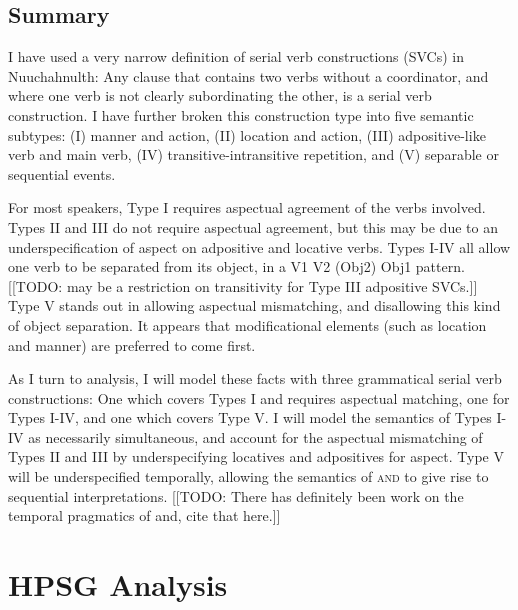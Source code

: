 \subsection{Summary}

I have used a very narrow definition of serial verb constructions (SVCs) in Nuuchahnulth: Any clause that contains two verbs without a coordinator, and where one verb is not clearly subordinating the other, is a serial verb construction. I have further broken this construction type into five semantic subtypes: (I) manner and action, (II) location and action, (III) adpositive-like verb and main verb, (IV) transitive-intransitive repetition, and (V) separable or sequential events.

For most speakers, Type I requires aspectual agreement of the verbs involved. Types II and III do not require aspectual agreement, but this may be due to an underspecification of aspect on adpositive and locative verbs. Types I-IV all allow one verb to be separated from its object, in a V1 V2 (Obj2) Obj1 pattern. [[TODO: may be a restriction on transitivity for Type III adpositive SVCs.]] Type V stands out in allowing aspectual mismatching, and disallowing this kind of object separation. It appears that modificational elements (such as location and manner) are preferred to come first.

As I turn to analysis, I will model these facts with three grammatical serial verb constructions: One which covers Types I and requires aspectual matching, one for Types I-IV, and one which covers Type V. I will model the semantics of Types I-IV as necessarily simultaneous, and account for the aspectual mismatching of Types II and III by underspecifying locatives and adpositives for aspect. Type V will be underspecified temporally, allowing the semantics of \textsc{and} to give rise to sequential interpretations. [[TODO: There has definitely been work on the temporal pragmatics of and, cite that here.]]

\section{HPSG Analysis} \label{sec:sv:analysis}